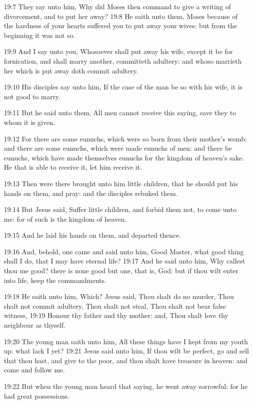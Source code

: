19:7 They say unto him, Why did Moses then command to give a writing of divorcement, and to put her away?  19:8 He saith unto them, Moses because of the hardness of your hearts suffered you to put away your wives: but from the beginning it was not so.

19:9 And I say unto you, Whosoever shall put away his wife, except it be for fornication, and shall marry another, committeth adultery: and whoso marrieth her which is put away doth commit adultery.

19:10 His disciples say unto him, If the case of the man be so with his wife, it is not good to marry.

19:11 But he said unto them, All men cannot receive this saying, save they to whom it is given.

19:12 For there are some eunuchs, which were so born from their mother's womb: and there are some eunuchs, which were made eunuchs of men: and there be eunuchs, which have made themselves eunuchs for the kingdom of heaven's sake. He that is able to receive it, let him receive it.

19:13 Then were there brought unto him little children, that he should put his hands on them, and pray: and the disciples rebuked them.

19:14 But Jesus said, Suffer little children, and forbid them not, to come unto me: for of such is the kingdom of heaven.

19:15 And he laid his hands on them, and departed thence.

19:16 And, behold, one came and said unto him, Good Master, what good thing shall I do, that I may have eternal life?  19:17 And he said unto him, Why callest thou me good? there is none good but one, that is, God: but if thou wilt enter into life, keep the commandments.

19:18 He saith unto him, Which? Jesus said, Thou shalt do no murder, Thou shalt not commit adultery, Thou shalt not steal, Thou shalt not bear false witness, 19:19 Honour thy father and thy mother: and, Thou shalt love thy neighbour as thyself.

19:20 The young man saith unto him, All these things have I kept from my youth up: what lack I yet?  19:21 Jesus said unto him, If thou wilt be perfect, go and sell that thou hast, and give to the poor, and thou shalt have treasure in heaven: and come and follow me.

19:22 But when the young man heard that saying, he went away sorrowful: for he had great possessions.

